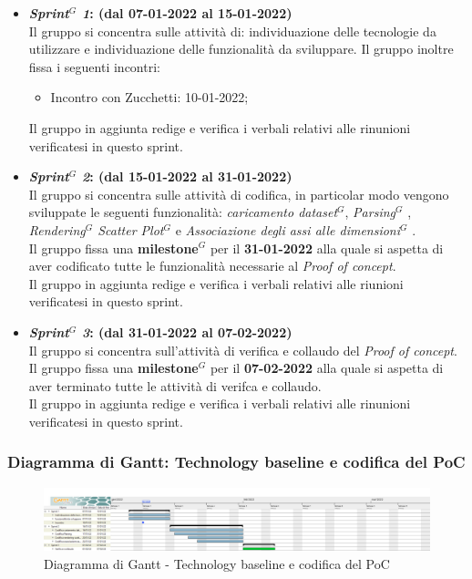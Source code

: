 \begin{itemize}
    \item \textbf{\textit{Sprint$^G$  1}: (dal 07-01-2022 al 15-01-2022)}\\
    Il gruppo si concentra sulle attività di: individuazione delle tecnologie da utilizzare e individuazione delle funzionalità da sviluppare.
    Il gruppo inoltre fissa i seguenti incontri:
    \begin{itemize}
        \item Incontro con Zucchetti: 10-01-2022;
    \end{itemize}
    Il gruppo in aggiunta redige e verifica i verbali relativi alle rinunioni verificatesi in questo sprint.

    \item \textbf{\textit{Sprint$^G$  2}: (dal 15-01-2022 al 31-01-2022)}\\
    Il gruppo si concentra sulle attività di codifica, in particolar modo vengono sviluppate le seguenti funzionalità: \textit{caricamento dataset$^{G}$}, \textit{Parsing}$^G$ , \textit{Rendering$^G$  Scatter Plot$^G$ } e \textit{Associazione degli assi alle dimensioni$^G$ }.\\
    Il gruppo fissa una \textbf{milestone}$^G$  per il \textbf{31-01-2022} alla quale si aspetta di aver codificato tutte le funzionalità necessarie al \textit{Proof of concept}.\\
    Il gruppo in aggiunta redige e verifica i verbali relativi alle riunioni verificatesi in questo sprint.

    \item \textbf{\textit{Sprint$^G$  3}: (dal 31-01-2022 al 07-02-2022)}\\
    Il gruppo si concentra sull'attività di verifica e collaudo del \textit{Proof of concept}.\\
    Il gruppo fissa una \textbf{milestone}$^G$  per il \textbf{07-02-2022} alla quale si aspetta di aver terminato tutte le attività di verifca e collaudo.\\
    Il gruppo in aggiunta redige e verifica i verbali relativi alle rinunioni verificatesi in questo sprint.
\end{itemize}

\subsubsection{Diagramma di Gantt: Technology baseline e codifica del PoC}
\begin{figure}[h!]
    \centering
    \includegraphics[scale=0.22]{../../assets/Diagrammi_Gantt/TB.png}
    \caption{Diagramma di Gantt - Technology baseline e codifica del PoC}
\end{figure}

